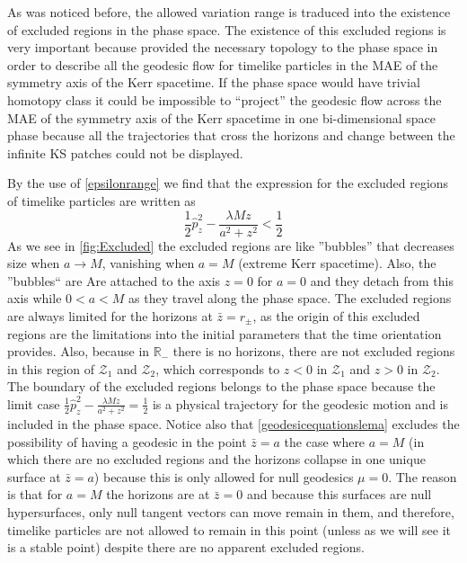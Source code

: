 As was noticed before, the allowed variation range is traduced into the existence of excluded regions in the phase space. The existence of this excluded regions is very important because provided the necessary topology to the phase space in order to describe all the geodesic flow for timelike particles in the \gls{MAE} of the symmetry axis of the Kerr spacetime. If the phase space would have trivial homotopy class it could be impossible to ``project'' the geodesic flow across the \gls{MAE} of the symmetry axis of the Kerr spacetime in one bi-dimensional space phase because all the trajectories that cross the horizons and change between the infinite \gls{KS} patches could not be displayed.

By the use of \cref{epsilonrange} we find that the expression for the excluded regions of timelike particles are written as
\begin{equation}
\frac{1}{2} \hat{p}_z^2 -\frac{ \lambda M z}{a^2+z^2}<\frac{1}{2}
\end{equation}
As we see in \cref{fig:Excluded} the excluded regions are like ''bubbles'' that decreases size when $a \to M$, vanishing when $a=M$ (extreme Kerr spacetime). Also, the ''bubbles`` are Are attached to the axis $z = 0$ for $a=0$ and they detach from this axis while $0<a<M$ as they travel along the phase space. The excluded regions are always limited for the horizons at $\bar z= r_\pm$, as the origin of this excluded regions are the limitations into the initial parameters that the time orientation provides. Also, because in $\mathbb{R}_-$ there is no horizons, there are not excluded regions in this region of $\mathcal{Z}_1$ and $\mathcal{Z}_2$, which corresponds to $z<0$ in $\mathcal{Z}_1$ and $z>0$ in $\mathcal{Z}_2$. The boundary of the excluded regions belongs to the phase space because the limit case $\frac{1}{2} \hat{p}_z^2 -\frac{ \lambda M z}{a^2+z^2}=\frac{1}{2}$ is a physical trajectory for the geodesic motion and is included in the phase space. Notice also that \cref{geodesicequationslema} excludes the possibility of having a geodesic in the point $\bar z=a$ the case where $a=M$ (in which there are no excluded regions and the horizons collapse in one unique surface at $\bar z=a$) because this is only allowed for null geodesics $\mu=0$. The reason is that for $a=M$ the horizons are at $\bar z=0$ and because this surfaces are null hypersurfaces, only null tangent vectors can move remain in them, and therefore, timelike particles are not allowed to remain in this point (unless as we will see it is a stable point) despite there are no apparent excluded regions.
 
